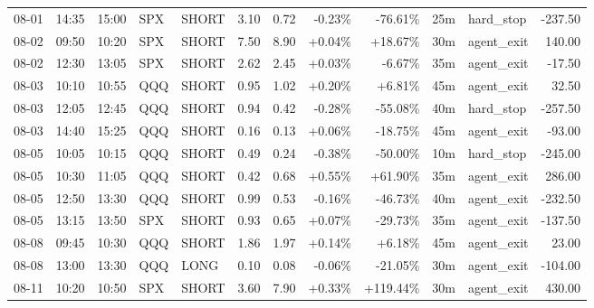 \documentclass[11pt,a4paper,twoside]{article}
\begin{document}
\begin{center}
\begin{longtable}{>{\color{txtmain}}l l l l l r r r r r >{\color{txtmain}}l r}
08-01 & 14:35 & 15:00 & SPX & SHORT & 3.10 & 0.72 & \textcolor{lossred}{-0.23\%} & \textcolor{lossred}{-76.61\%} & 25m & hard\_stop & \textcolor{lossred}{-237.50} \\
08-02 & 09:50 & 10:20 & SPX & SHORT & 7.50 & 8.90 & \textcolor{wingreen}{+0.04\%} & \textcolor{wingreen}{+18.67\%} & 30m & agent\_exit & \textcolor{wingreen}{140.00} \\
08-02 & 12:30 & 13:05 & SPX & SHORT & 2.62 & 2.45 & \textcolor{wingreen}{+0.03\%} & \textcolor{lossred}{-6.67\%} & 35m & agent\_exit & \textcolor{lossred}{-17.50} \\
08-03 & 10:10 & 10:55 & QQQ & SHORT & 0.95 & 1.02 & \textcolor{wingreen}{+0.20\%} & \textcolor{wingreen}{+6.81\%} & 45m & agent\_exit & \textcolor{wingreen}{32.50} \\
08-03 & 12:05 & 12:45 & QQQ & SHORT & 0.94 & 0.42 & \textcolor{lossred}{-0.28\%} & \textcolor{lossred}{-55.08\%} & 40m & hard\_stop & \textcolor{lossred}{-257.50} \\
08-03 & 14:40 & 15:25 & QQQ & SHORT & 0.16 & 0.13 & \textcolor{wingreen}{+0.06\%} & \textcolor{lossred}{-18.75\%} & 45m & agent\_exit & \textcolor{lossred}{-93.00} \\
08-05 & 10:05 & 10:15 & QQQ & SHORT & 0.49 & 0.24 & \textcolor{lossred}{-0.38\%} & \textcolor{lossred}{-50.00\%} & 10m & hard\_stop & \textcolor{lossred}{-245.00} \\
08-05 & 10:30 & 11:05 & QQQ & SHORT & 0.42 & 0.68 & \textcolor{wingreen}{+0.55\%} & \textcolor{wingreen}{+61.90\%} & 35m & agent\_exit & \textcolor{wingreen}{286.00} \\
08-05 & 12:50 & 13:30 & QQQ & SHORT & 0.99 & 0.53 & \textcolor{lossred}{-0.16\%} & \textcolor{lossred}{-46.73\%} & 40m & agent\_exit & \textcolor{lossred}{-232.50} \\
08-05 & 13:15 & 13:50 & SPX & SHORT & 0.93 & 0.65 & \textcolor{wingreen}{+0.07\%} & \textcolor{lossred}{-29.73\%} & 35m & agent\_exit & \textcolor{lossred}{-137.50} \\
08-08 & 09:45 & 10:30 & QQQ & SHORT & 1.86 & 1.97 & \textcolor{wingreen}{+0.14\%} & \textcolor{wingreen}{+6.18\%} & 45m & agent\_exit & \textcolor{wingreen}{23.00} \\
08-08 & 13:00 & 13:30 & QQQ & LONG & 0.10 & 0.08 & \textcolor{lossred}{-0.06\%} & \textcolor{lossred}{-21.05\%} & 30m & agent\_exit & \textcolor{lossred}{-104.00} \\
08-11 & 10:20 & 10:50 & SPX & SHORT & 3.60 & 7.90 & \textcolor{wingreen}{+0.33\%} & \textcolor{wingreen}{+119.44\%} & 30m & agent\_exit & \textcolor{wingreen}{430.00} \\

\end{longtable}
\end{center}
\end{document}
